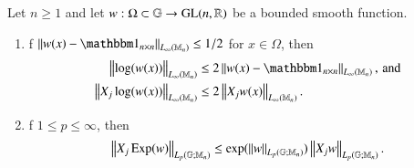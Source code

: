 \documentclass[leqno]{amsart}
\begin{document}
	\begin{lemma}\label{log-exp-xk}
		Let $n\geq1$ and let $w:\Omega\subset\mathbb{G}\rightarrow{\rm GL}(n,\mathbb{R})$ be a bounded smooth function.
		\begin{enumerate}[\rm (1)]
			\item\label{log} f $\Norm{w(x)-\unit_{n\times n}}_{\lm{n}}\leq 1/2$ for $x\in\Omega$, then 
			\begin{align*}
				\Norm{\log(w(x))}_{\lm{n}}&\leq2\Norm{w(x)-\unit_{n\times n}}_{\lm{n}},\,\text{and}\\
				\Norm{X_{j}\log(w(x))}_{\lm{n}}&\leq2\Norm{X_{j}w(x)}_{\lm{n}}.
			\end{align*}
			
			\item\label{exp} f $1\leq p\leq\infty$, then
			$$\left\| X_{j}\operatorname{\rm Exp}(w) \right\|_{L_{p}(\mathbb{G};\mathbb{M}_{n})}\leq \exp(\left\| w \right\|_{L_{p}(\mathbb{G};\mathbb{M}_{n})})\left\| X_{j}w \right\|_{L_{p}(\mathbb{G};\mathbb{M}_{n})}.$$
		\end{enumerate}
	\end{lemma}
\end{document}
